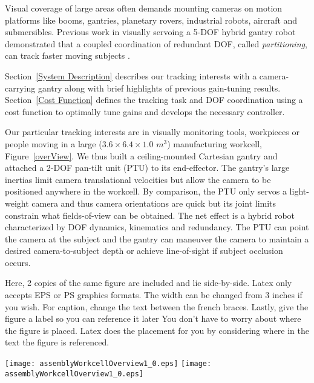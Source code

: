 \documentclass[twocolumn]{article} %
\makeatletter
\def\section{\@startsection {section}{1}{\z@}{1.0ex plus
1ex minus .2ex}{.2ex plus .2ex}{\large\bf}}
\makeatother
\begin{document}
Visual coverage of large areas often demands mounting cameras on motion
platforms like booms, gantries, planetary rovers, industrial robots, aircraft 
and submersibles.  Previous work in visually servoing a 5-DOF hybrid gantry robot 
demonstrated that a coupled coordination of redundant DOF, called {\it partitioning}, 
can track faster moving subjects \cite{OhTRA2001}. 

Section~\ref{System Description} describes our tracking interests with a 
camera-carrying gantry along with brief highlights of previous gain-tuning results.  
Section~\ref{Cost Function} defines the tracking task and DOF coordination using a 
cost function to optimally tune gains and develops the necessary controller. 

\section{System Description}
\label{System Description}

Our particular tracking interests are in visually monitoring tools, workpieces 
or people moving in a large ($3.6\times6.4\times1.0$ $m^3$) manufacturing workcell,
Figure~\ref{overView}. We thus built a ceiling-mounted Cartesian gantry and attached a 2-DOF 
pan-tilt unit (PTU) to its end-effector.  The gantry's large inertias limit camera translational
velocities but allow the camera to be positioned anywhere in the workcell.  By 
comparison, the PTU only servos a light-weight camera and thus camera orientations are 
quick but its joint limits constrain what fields-of-view can be obtained.  The net 
effect is a hybrid robot characterized by DOF dynamics, kinematics and redundancy.
The PTU can point the camera at the subject and the gantry can maneuver the camera
to maintain a desired camera-to-subject depth or achieve line-of-sight if subject
occlusion occurs.


Here, 2 copies of the same figure are included and lie side-by-side.  Latex only 
accepts EPS or PS graphics formats.  The width can be changed from 3 inches
if you wish.  For caption, change the text between the french braces.
Lastly, give the figure a label so you can reference it later
You don't have to worry about where the figure is placed.  Latex does the
placement for you by considering where in the text the figure is referenced.

\begin{figure*}
\centerline{
\mbox{\texttt{[image: assemblyWorkcellOverview1\_0.eps]}}
\mbox{\texttt{[image: assemblyWorkcellOverview1\_0.eps]}}
}
\caption{Replace text here with your desired caption.}
\label{overView}
\end{figure*}
\end{document}
